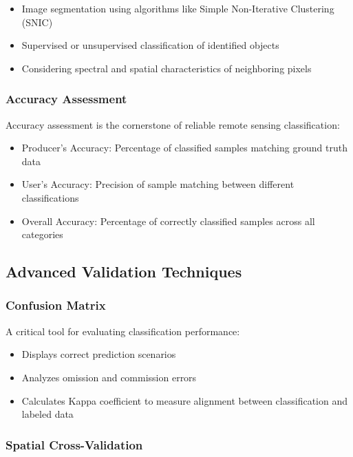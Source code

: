 \documentclass[
  letterpaper,
]{scrbook}
\begin{document}
\begin{itemize}
\item
  Image segmentation using algorithms like Simple Non-Iterative
  Clustering (SNIC)
\item
  Supervised or unsupervised classification of identified objects
\item
  Considering spectral and spatial characteristics of neighboring pixels
\end{itemize}

\subsubsection{Accuracy Assessment}\label{accuracy-assessment-1}

Accuracy assessment is the cornerstone of reliable remote sensing
classification:

\begin{itemize}
\item
  Producer's Accuracy: Percentage of classified samples matching ground
  truth data
\item
  User's Accuracy: Precision of sample matching between different
  classifications
\item
  Overall Accuracy: Percentage of correctly classified samples across
  all categories
\end{itemize}

\subsection{Advanced Validation
Techniques}\label{advanced-validation-techniques}

\subsubsection{Confusion Matrix}\label{confusion-matrix}

A critical tool for evaluating classification performance:

\begin{itemize}
\item
  Displays correct prediction scenarios
\item
  Analyzes omission and commission errors
\item
  Calculates Kappa coefficient to measure alignment between
  classification and labeled data
\end{itemize}

\subsubsection{Spatial Cross-Validation}\label{spatial-cross-validation}
\end{document}
